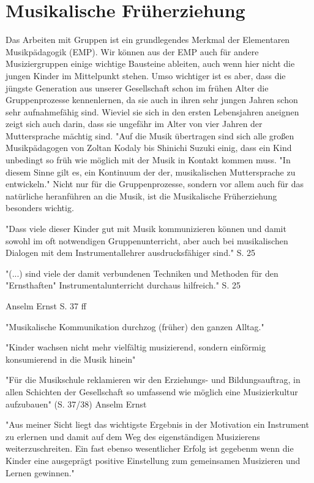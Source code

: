\section{Musikalische Früherziehung}

Das Arbeiten mit Gruppen ist ein grundlegendes Merkmal der Elementaren
Musikpädagogik (EMP). Wir können aus der EMP auch für andere Musiziergruppen einige
wichtige Bausteine ableiten, auch wenn hier nicht die jungen Kinder im
Mittelpunkt stehen. Umso wichtiger ist es aber, dass die jüngste Generation aus
unserer Gesellschaft schon im frühen Alter die Gruppenprozesse kennenlernen, da
sie auch in ihren sehr jungen Jahren schon sehr aufnahmefähig sind. Wieviel sie
sich in den ersten Lebensjahren aneignen zeigt sich auch darin, dass sie
ungefähr im Alter von vier Jahren der Muttersprache mächtig sind. "Auf die Musik übertragen sind sich alle großen
Musikpädagogen von Zoltan Kodaly bis Shinichi Suzuki einig, dass ein Kind
unbedingt so früh wie möglich mit der Musik in Kontakt kommen muss. "In diesem
Sinne gilt es, ein Kontinuum der der, musikalischen Muttersprache zu
entwickeln." \autocite[45]{ernst:die_zukunftsfaehige_musikschule} Nicht nur
für die Gruppenprozesse, sondern vor allem auch für das natürliche heranführen an
die Musik, ist die Musikalische Früherziehung besonders wichtig.



"Dass viele dieser Kinder gut mit Musik kommunizieren können und damit sowohl im
oft notwendigen Gruppenunterricht, aber auch bei musikalischen Dialogen mit dem
Instrumentallehrer ausdrucksfähiger sind." S. 25

"(...) sind viele der damit verbundenen Techniken und Methoden für den
"Ernsthaften" Instrumentalunterricht durchaus hilfreich." S. 25

Anselm Ernst S. 37 ff

"Musikalische Kommunikation durchzog (früher) den ganzen Alltag."
\autocite[37]{ernst:die_zukunftsfaehige_musikschule}

"Kinder wachsen nicht mehr vielfältig musizierend, sondern einförmig
konsumierend in die Musik hinein" \autocite[37]{ernst:die_zukunftsfaehige_musikschule}

"Für die Musikschule reklamieren wir den Erziehungs- und Bildungsauftrag, in
allen Schichten der Gesellschaft so umfassend wie möglich eine Musizierkultur
aufzubauen" (S. 37/38) Anselm Ernst

"Aus meiner Sicht liegt das wichtigste Ergebnis in der Motivation ein Instrument
zu erlernen und damit auf dem Weg des eigenständigen Musizierens
weiterzuschreiten. Ein fast ebenso wesentlicher Erfolg ist gegebenm wenn die
Kinder eine ausgeprägt positive Einstellung zum gemeinsamen Musizieren und
Lernen gewinnen." \autocite[40]{ernst:die_zukunftsfaehige_musikschule}


